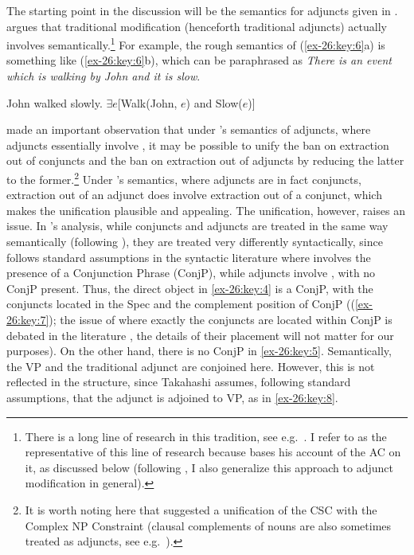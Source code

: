 \documentclass[output=paper]{langsci/langscibook}
\begin{document}
The starting point in the discussion will be the semantics for adjuncts given
in \citet{Higginbotham1985}. \citeauthor{Higginbotham1985} argues that
traditional  modification (henceforth traditional adjuncts) actually
involves  semantically.\footnote{There is a long line of research
    in this tradition, see e.g.\
    \citet{Davidson1967,Parsons1980,Parsons1990,Dowty1989,%
    Takahashi1994,Progovac1998,Progovac1999,Hunter2011}. I refer to
    \citet{Higginbotham1985} as the representative of this line of research
because \citet{Takahashi1994} bases his account of the \glsdesc{AC} on it, as
discussed below (following \citeauthor{Takahashi1994}, I also generalize this
approach to adjunct modification in general).} For example, the rough semantics
of (\ref{ex-26:key:6}a) is something like (\ref{ex-26:key:6}b), which can be paraphrased as \emph{There is an
event which is walking by John and it is slow}.

\ea\label{ex-26:key:6}
	\ea John walked slowly.
    \ex $\exists e$[Walk(John, $e$) and Slow($e$)]
	\z
\z

\citet{Takahashi1994} made an important observation that under
\citeauthor{Higginbotham1985}’s semantics of adjuncts, where adjuncts
essentially involve \isi{coordination}, it may be possible to unify the ban on
extraction out of conjuncts and the ban on extraction out of adjuncts by
reducing the latter to the former.\footnote{It is worth noting here that
    \citet{Ross1974} suggested a unification of the \gls{CSC} with the Complex
    NP Constraint (clausal complements of nouns are also sometimes treated as
adjuncts, see e.g.\ \citealt{Stowell1981,Takahashi1994}).} Under
\citeauthor{Higginbotham1985}’s semantics, where adjuncts are in fact
conjuncts, extraction out of an adjunct does involve extraction out of a
conjunct, which makes the unification plausible and appealing. The unification,
however, raises an issue. In \citeauthor{Takahashi1994}’s analysis, while
conjuncts and adjuncts\is{adjunction} are treated in the same way semantically (following
\citeauthor{Higginbotham1985}), they are treated very differently
syntactically, since \citeauthor{Takahashi1994} follows standard assumptions in
the syntactic literature where \isi{coordination} involves the presence of a
Conjunction Phrase (ConjP), while adjuncts\is{adjunction} involve , with no ConjP
present. Thus, the direct object in \eqref{ex-26:key:4} is a ConjP, with the conjuncts located
in the Spec and the complement position of ConjP ((\ref{ex-26:key:7}); the issue of where
exactly the conjuncts are located within ConjP is debated in the literature
\parencite[see e.g.][]{Munn1993,Progovac1999}, the details of their placement
will not matter for our purposes). On the other hand, there is no ConjP in \eqref{ex-26:key:5}.
Semantically, the VP and the traditional adjunct are conjoined here.  However,
this is not reflected in the structure, since Takahashi assumes, following
standard assumptions, that the adjunct is adjoined\is{adjunction} to VP, as in \eqref{ex-26:key:8}.
\end{document}
